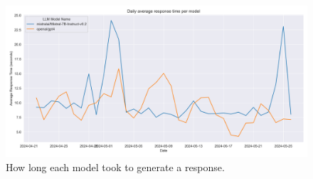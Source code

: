 \begin{figure}[H]
    \centering
    \includegraphics[width=\textwidth]{results/plots/assets/performance-04-daily-average-response-time.png}
    \caption{How long each model took to generate a response.}
    \label{fig:performance_04_daily_average_response_time}
\end{figure}